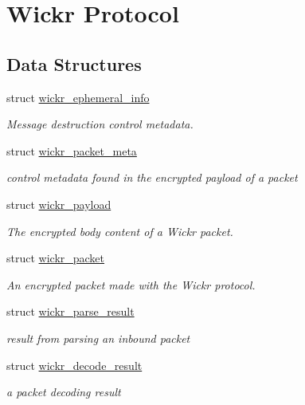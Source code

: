 \hypertarget{group__wickr__protocol}{}\section{Wickr Protocol}
\label{group__wickr__protocol}
\subsection*{Data Structures}
\begin{DoxyCompactItemize}
\item 
struct \mbox{\hyperlink{structwickr__ephemeral__info}{wickr\+\_\+ephemeral\+\_\+info}}
\begin{DoxyCompactList}\small\item\em Message destruction control metadata. \end{DoxyCompactList}\item 
struct \mbox{\hyperlink{structwickr__packet__meta}{wickr\+\_\+packet\+\_\+meta}}
\begin{DoxyCompactList}\small\item\em control metadata found in the encrypted payload of a packet \end{DoxyCompactList}\item 
struct \mbox{\hyperlink{structwickr__payload}{wickr\+\_\+payload}}
\begin{DoxyCompactList}\small\item\em The encrypted body content of a Wickr packet. \end{DoxyCompactList}\item 
struct \mbox{\hyperlink{structwickr__packet}{wickr\+\_\+packet}}
\begin{DoxyCompactList}\small\item\em An encrypted packet made with the Wickr protocol. \end{DoxyCompactList}\item 
struct \mbox{\hyperlink{structwickr__parse__result}{wickr\+\_\+parse\+\_\+result}}
\begin{DoxyCompactList}\small\item\em result from parsing an inbound packet \end{DoxyCompactList}\item 
struct \mbox{\hyperlink{structwickr__decode__result}{wickr\+\_\+decode\+\_\+result}}
\begin{DoxyCompactList}\small\item\em a packet decoding result \end{DoxyCompactList}\end{DoxyCompactItemize}
